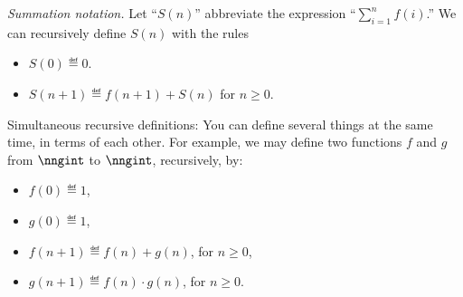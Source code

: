 \begin{example}
\emph{Summation notation.}\label{sum-notation-def} Let 
``$S(n)$'' abbreviate the expression ``$\sum_{i=1}^n f(i)$.''  We can recursively define
$S(n)$ with the rules
  \begin{itemize}
  \item $S(0) \eqdef 0$.
  \item $S(n+1) \eqdef  f(n+1) + S(n)$ for $n\geq 0$.
  \end{itemize}
\end{example}

\begin{editingnotes}

\item[Simultaneous recursive definitions:]
  You can define several things at the same time, in terms of each
  other.  For example, we may define two functions $f$ and $g$ from
  $\nngint$ to $\nngint$, recursively, by:
  \begin{itemize}
  \item
    $f(0) \eqdef 1$,
  \item
    $g(0) \eqdef 1$,
  \item
    $f(n+1) \eqdef f(n) + g(n)$, for $n \geq 0$,
  \item
    $g(n+1) \eqdef f(n) \cdot g(n)$, for $n \geq 0$.
  \end{itemize}

\end{editingnotes}

